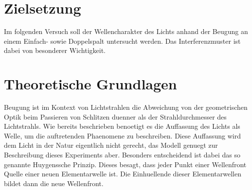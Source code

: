 \section{Zielsetzung}
Im folgenden Versuch soll der Wellencharakter des Lichts anhand der Beugung an einem Einfach- sowie Doppelspalt untersucht werden. Das Interferenzmuster ist dabei von besonderer Wichtigkeit.
\section{Theoretische Grundlagen}
Beugung ist im Kontext von Lichtstrahlen die Abweichung von der geometrischen Optik beim Passieren von Schlitzen duenner als der Strahldurchmesser des Lichtstrahls. Wie bereits beschrieben benoetigt es die Auffassung des Lichts als Welle, um die auftretenden Phaenomene zu beschreiben. Diese Auffassung wird dem Licht in der Natur eigentlich nicht gerecht, das Modell genuegt zur Beschreibung dieses Experiments aber. Besonders entscheidend ist dabei das so genannte Huygenssche Prinzip. Dieses besagt, dass jeder Punkt einer Wellenfront Quelle einer neuen Elementarwelle ist. Die Einhuellende dieser Elementarwellen bildet dann die neue Wellenfront. 